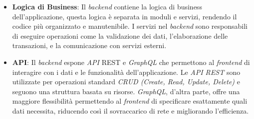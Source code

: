 \begin{itemize}
    \item \textbf{Logica di Business}: Il \textit{backend} contiene la logica di business dell'applicazione, questa logica è separata in moduli e servizi, rendendo il codice più organizzato e manutenibile.
    I servizi nel \textit{backend} sono responsabili di eseguire operazioni come la validazione dei dati, l'elaborazione delle transazioni, e la comunicazione con servizi esterni.
    \item \textbf{API}: Il \textit{backend} espone \textit{API} REST e \textit{GraphQL} che permettono al \textit{frontend} di interagire con i dati e le funzionalità dell'applicazione. Le \textit{API REST} sono utilizzate per operazioni standard \textit{CRUD (Create, Read, Update, Delete)} e seguono una struttura basata su risorse. 
    \textit{GraphQL}, d'altra parte, offre una maggiore flessibilità permettendo al \textit{frontend} di specificare esattamente quali dati necessita, riducendo così il sovraccarico di rete e migliorando l'efficienza.
\end{itemize}

